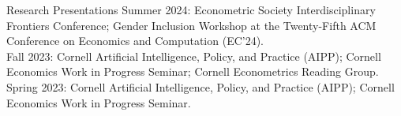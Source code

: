 \documentclass{resume} %
\newcommand{\itab}[1]{\hspace{0em}\rlap{#1}}
\begin{document}










\begin{rSection}{Research Presentations}
Summer 2024: Econometric Society Interdisciplinary Frontiers Conference; Gender Inclusion Workshop at the Twenty-Fifth ACM Conference on Economics and Computation (EC'24). \\
Fall 2023: Cornell Artificial Intelligence, Policy, and Practice (AIPP); Cornell Economics Work in Progress Seminar; Cornell Econometrics Reading Group. \\
Spring 2023: Cornell Artificial Intelligence, Policy, and Practice (AIPP); Cornell Economics Work in Progress Seminar.
\end{rSection}
\end{document}
